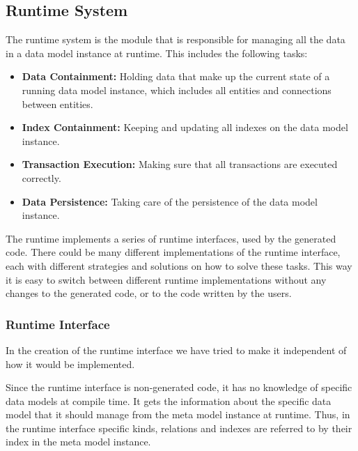 
\subsection{\label{sec:Runtime}Runtime System}

The runtime system is the module that is responsible for managing
all the data in a data model instance at runtime. This includes the
following tasks:
\begin{itemize}
\item \textbf{Data Containment: }Holding data that make up the current state
of a running data model instance, which includes all entities and
connections between entities.
\item \textbf{Index Containment:} Keeping and updating all indexes on the
data model instance.
\item \textbf{Transaction Execution:} Making sure that all transactions
are executed correctly.
\item \textbf{Data Persistence:} Taking care of the persistence of the data
model instance. 
\end{itemize}
The runtime implements a series of runtime interfaces, used by the
generated code. There could be many different implementations of the
runtime interface, each with different strategies and solutions on
how to solve these tasks. This way it is easy to switch between different
runtime implementations without any changes to the generated code,
or to the code written by the users.


\subsubsection{Runtime Interface}

In the creation of the runtime interface we have tried to make it
independent of how it would be implemented.

Since the runtime interface is non-generated code, it has no knowledge
of specific data models at compile time. It gets the information about
the specific data model that it should manage from the meta model
instance at runtime. Thus, in the runtime interface specific kinds,
relations and indexes are referred to by their index in the meta model
instance.

